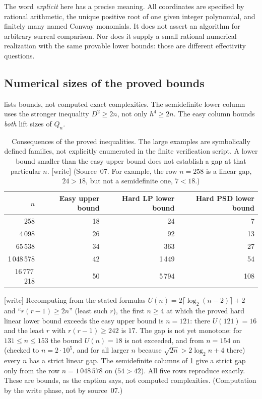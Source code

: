\documentclass[11pt,a4paper]{article}
\numberwithin{equation}{section}
\theoremstyle{plain}
\newcommand{\wtag}{\textup{[write]}}%
\begin{document}
The word \emph{explicit} here has a precise meaning. All coordinates are
specified by rational arithmetic, the unique positive root of one given
integer polynomial, and finitely many named Conway monomials. It does
not assert an algorithm for arbitrary surreal comparison. Nor does it
supply a small rational numerical realization with the same provable
lower bounds: those are different effectivity questions.

\subsection{Numerical sizes of the proved bounds}
 lists bounds, not computed exact complexities. The
semidefinite lower column uses the stronger inequality $D^2\geq2n$, not
only $h^4\geq2n$. The easy column bounds \emph{both} lift sizes of $Q_n$.

\begin{table}[ht]
\centering
\begin{tabular}{@{}rrrr@{}}
\toprule
$n$ & Easy upper bound & Hard LP lower bound & Hard PSD lower bound\\
\midrule
258 & 18 & 24 & 7\\
4\,098 & 26 & 92 & 13\\
65\,538 & 34 & 363 & 27\\
1\,048\,578 & 42 & 1\,449 & 54\\
16\,777\,218 & 50 & 5\,794 & 108\\
\bottomrule
\end{tabular}
\caption{Consequences of the proved inequalities. The large examples are
symbolically defined families, not explicitly enumerated in the finite
verification script. A lower bound smaller than the easy upper bound does
not establish a gap at that particular $n$.
\wtag{} (Source~07. For example, the row $n=258$ is a linear gap,
$24>18$, but not a semidefinite one, $7<18$.)}
\label{poly:ic:tab:bounds}
\end{table}

\begin{remark}\label{poly:ic:rem:firstgap}
\wtag{} Recomputing from the stated formulas
$U(n)=2\lceil\log_2(n-2)\rceil+2$ and ``$r(r-1)\geq2n$'' (least such $r$),
the first $n\geq4$ at which the proved hard linear lower bound exceeds the
easy upper bound is $n=121$: there $U(121)=16$ and the least $r$ with
$r(r-1)\geq242$ is $17$. The gap is not yet monotone: for
$131\leq n\leq153$ the bound $U(n)=18$ is not exceeded, and from $n=154$
on (checked to $n=2\cdot10^5$, and for all larger $n$ because
$\sqrt{2n}>2\log_2 n+4$ there) every $n$ has a strict linear gap. The
semidefinite columns of \cref{poly:ic:tab:bounds} give a strict gap only
from the row $n=1\,048\,578$ on ($54>42$). All five rows reproduce
exactly. These are bounds, as the caption says, not computed
complexities. (Computation by the write phase, not by source~07.)
\end{remark}
\end{document}
